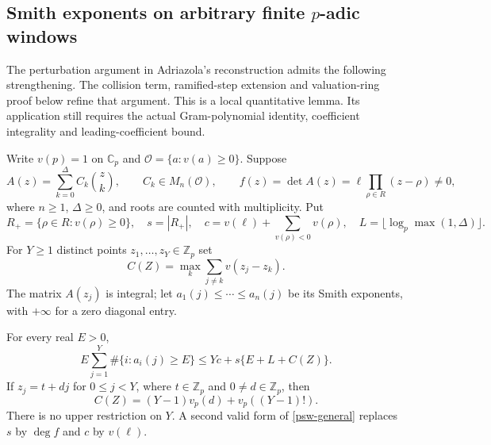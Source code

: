 \subsection{Smith exponents on arbitrary finite $p$-adic windows}
\label{psw-subsection}

The perturbation argument in Adriazola's reconstruction
\cite[Section~12]{adriazola-reconstruction}
admits the following strengthening.  The collision term, ramified-step
extension and valuation-ring proof below refine that argument.  This is a local quantitative
lemma.  Its application still requires the actual Gram-polynomial
identity, coefficient integrality and leading-coefficient bound.

Write $v(p)=1$ on $\mathbb C_p$ and
$\mathcal O=\{a:v(a)\ge0\}$.  Suppose
\[
 A(z)=\sum_{k=0}^{\Delta}C_k\binom zk,
 \qquad C_k\in M_n(\mathcal O),\qquad
 f(z)=\det A(z)=\ell\prod_{\rho\in R}(z-\rho)\ne0,
\]
where $n\ge1$, $\Delta\ge0$, and roots are counted with
multiplicity.  Put
\[
 R_+=\{\rho\in R:v(\rho)\ge0\},\quad s=|R_+|,\quad
 c=v(\ell)+\sum_{v(\rho)<0}v(\rho),\quad
 L=\lfloor\log_p\max(1,\Delta)\rfloor.
\]
For $Y\ge1$ distinct points $z_1,\ldots,z_Y\in\mathbb Z_p$ set
\[
 C(Z)=\max_k\sum_{j\ne k}v(z_j-z_k).
\]
The matrix $A(z_j)$ is integral; let $a_1(j)\le\cdots\le a_n(j)$
be its Smith exponents, with $+\infty$ for a zero diagonal entry.

\begin{theorem}\label{psw-window}
For every real $E>0$,
\begin{equation}\label{psw-general}
 E\sum_{j=1}^Y\#\{i:a_i(j)\ge E\}
       \le Yc+s\{E+L+C(Z)\}.
\end{equation}
If $z_j=t+dj$ for $0\le j<Y$, where
$t\in\mathbb Z_p$ and $0\ne d\in\mathbb Z_p$, then
\[
 C(Z)=(Y-1)v_p(d)+v_p((Y-1)!).
\]
There is no upper restriction on $Y$.  A second valid form of
\eqref{psw-general} replaces $s$ by $\deg f$ and $c$ by $v(\ell)$.
\end{theorem}

